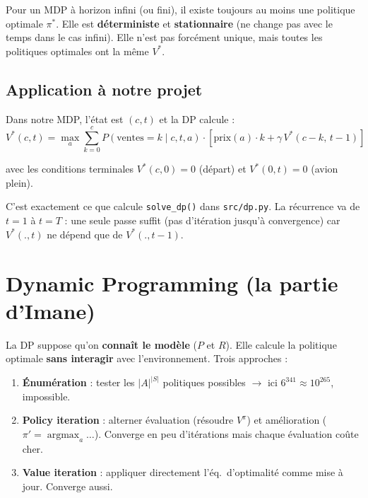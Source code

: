 \documentclass[11pt,a4paper]{article}
\DeclareMathOperator*{\argmax}{argmax}
\begin{document}
\begin{defbox}
Pour un MDP à horizon infini (ou fini), il existe toujours au moins une politique optimale $\pi^*$. Elle est \textbf{déterministe} et \textbf{stationnaire} (ne change pas avec le temps dans le cas infini). Elle n'est pas forcément unique, mais toutes les politiques optimales ont la même $V^*$.
\end{defbox}

\subsection{Application à notre projet}

Dans notre MDP, l'état est $(c, t)$ et la DP calcule :
\begin{equation}
\boxed{V^*(c, t) = \max_a \sum_{k=0}^{c} P(\text{ventes} = k \mid c, t, a) \cdot \left[\text{prix}(a) \cdot k + \gamma\, V^*(c - k,\, t - 1)\right]}
\label{eq:dp_project}
\end{equation}

avec les conditions terminales $V^*(c, 0) = 0$ (départ) et $V^*(0, t) = 0$ (avion plein).

C'est exactement ce que calcule \texttt{solve\_dp()} dans \texttt{src/dp.py}. La récurrence va de $t=1$ à $t=T$ : une seule passe suffit (pas d'itération jusqu'à convergence) car $V^*(., t)$ ne dépend que de $V^*(., t-1)$.

\section{Dynamic Programming (la partie d'Imane)}
\label{sec:dp}

\begin{defbox}[Compétence C12 — DP = model-based]
La DP suppose qu'on \textbf{connaît le modèle} ($P$ et $R$). Elle calcule la politique optimale \textbf{sans interagir} avec l'environnement. Trois approches :
\begin{enumerate}[nosep]
  \item \textbf{Énumération} : tester les $|A|^{|S|}$ politiques possibles $\to$ ici $6^{341} \approx 10^{265}$, impossible.
  \item \textbf{Policy iteration} : alterner évaluation (résoudre $V^\pi$) et amélioration ($\pi' = \argmax_a \ldots$). Converge en peu d'itérations mais chaque évaluation coûte cher.
  \item \textbf{Value iteration} : appliquer directement l'éq.~d'optimalité comme mise à jour. Converge aussi.
\end{enumerate}
\end{defbox}
\end{document}

